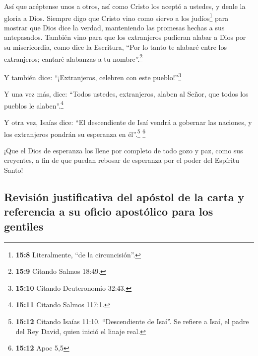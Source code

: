  Así que acéptense unos a otros, así como Cristo los
aceptó a ustedes, y denle la gloria a Dios.  Siempre digo
que Cristo vino como siervo a los judíos\footnote{\textbf{15:8}
  Literalmente, ``de la circuncisión''.} para mostrar que Dios dice la
verdad, manteniendo las promesas hechas a sus antepasados.
 También vino para que los extranjeros pudieran alabar a
Dios por su misericordia, como dice la Escritura, ``Por lo tanto te
alabaré entre los extranjeros; cantaré alabanzas a tu
nombre''.\footnote{\textbf{15:9} Citando Salmos 18:49.}

 Y también dice: ``¡Extranjeros, celebren con este
pueblo!''\footnote{\textbf{15:10} Citando Deuteronomio 32:43.}

 Y una vez más, dice: ``Todos ustedes, extranjeros,
alaben al Señor, que todos los pueblos le alaben''.\footnote{\textbf{15:11}
  Citando Salmos 117:1.}

 Y otra vez, Isaías dice: ``El descendiente de Isaí
vendrá a gobernar las naciones, y los extranjeros pondrán su esperanza
en él''.\footnote{\textbf{15:12} Citando Isaías 11:10. ``Descendiente de
  Isaí''. Se refiere a Isaí, el padre del Rey David, quien inició el
  linaje real.} \footnote{\textbf{15:12} Apoc 5,5}

 ¡Que el Dios de esperanza los llene por completo de todo
gozo y paz, como sus creyentes, a fin de que puedan rebosar de esperanza
por el poder del Espíritu Santo!

\hypertarget{revisiuxf3n-justificativa-del-apuxf3stol-de-la-carta-y-referencia-a-su-oficio-apostuxf3lico-para-los-gentiles}{%
\subsection{Revisión justificativa del apóstol de la carta y referencia
a su oficio apostólico para los
gentiles}\label{revisiuxf3n-justificativa-del-apuxf3stol-de-la-carta-y-referencia-a-su-oficio-apostuxf3lico-para-los-gentiles}}

